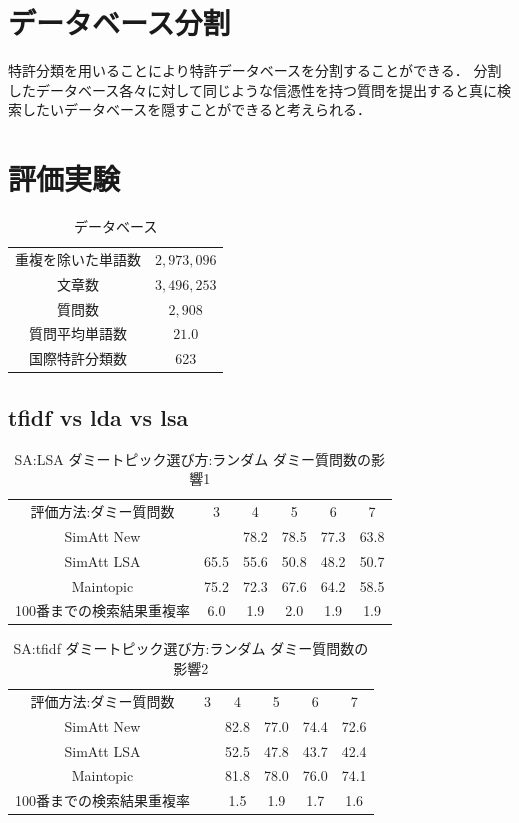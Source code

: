 \documentclass[master]{suribt}
\theoremstyle{definition}
\begin{document}
 \chapter{データベース分割}
 特許分類を用いることにより特許データベースを分割することができる．
 分割したデータベース各々に対して同じような信憑性を持つ質問を提出すると真に検索したいデータベースを隠すことができると考えられる．

 \chapter{評価実験}

 \begin{table}[!hbp]
 \center
 \begin{tabular}{|c|c|}
 \hline
 重複を除いた単語数 & $2,973,096$  \\
 文章数 & $3,496,253$ \\
 質問数 & $2,908$ \\
 質問平均単語数 & $21.0$ \\
 国際特許分類数 & 623 \\
 \hline
 \end{tabular}
 \caption{データベース}
 \end{table}



 \section{tfidf vs lda vs lsa}
 \begin{table}[!hbp]
 \center
 \begin{tabular}{|c|c|c|c|c|c|}
 \hline
 評価方法:ダミー質問数  & 3 & 4 & 5 & 6 & 7    \\
 SimAtt New &  & 78.2 & 78.5 & 77.3 & 63.8 \\
 SimAtt LSA & 65.5 &55.6 & 50.8 & 48.2 & 50.7 \\
 Maintopic & 75.2 & 72.3 & 67.6 & 64.2 & 58.5 \\
 100番までの検索結果重複率 & 6.0 & 1.9 & 2.0 & 1.9 & 1.9 \\
 \hline
 \end{tabular}
 \caption{SA:LSA ダミートピック選び方:ランダム ダミー質問数の影響1}
 \end{table}

 \begin{table}[!hbp]
 \center
 \begin{tabular}{|c|c|c|c|c|c|}
 \hline
 評価方法:ダミー質問数  & 3 & 4 & 5 & 6 & 7    \\
 SimAtt New &  & 82.8 & 77.0 & 74.4 & 72.6 \\
 SimAtt LSA &  & 52.5 & 47.8 & 43.7 & 42.4 \\
 Maintopic &  & 81.8 & 78.0 & 76.0 & 74.1 \\
 100番までの検索結果重複率 &  & 1.5 & 1.9 & 1.7 & 1.6 \\
 \hline
 \end{tabular}
 \caption{SA:tfidf ダミートピック選び方:ランダム ダミー質問数の影響2}
 \end{table}
\end{document}
